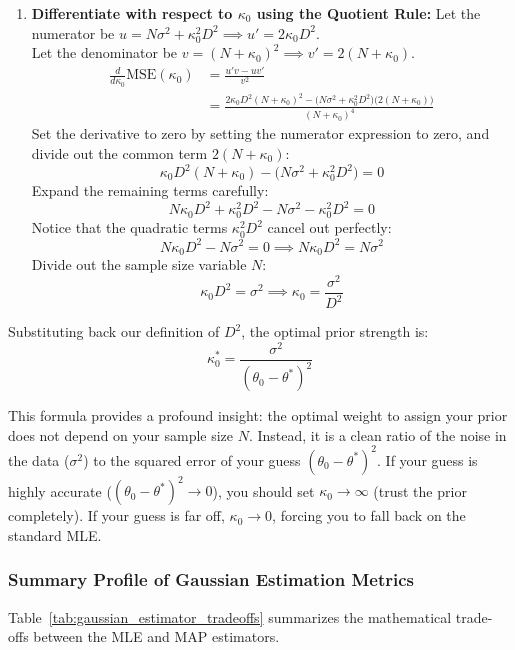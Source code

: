 \documentclass{article}
\begin{document}
\begin{enumerate}
    \item \textbf{Differentiate with respect to $\kappa_0$ using the Quotient Rule:}
    Let the numerator be $u = N\sigma^2 + \kappa_0^2 D^2 \implies u' = 2\kappa_0 D^2$. \\
    Let the denominator be $v = (N + \kappa_0)^2 \implies v' = 2(N + \kappa_0)$.
    \begin{align}
    \frac{d}{d\kappa_0}\text{MSE}(\kappa_0) &= \frac{u'v - uv'}{v^2} \\
    &= \frac{2\kappa_0 D^2(N + \kappa_0)^2 - \big(N\sigma^2 + \kappa_0^2 D^2\big)\big(2(N + \kappa_0)\big)}{(N + \kappa_0)^4}
    \end{align}
    Set the derivative to zero by setting the numerator expression to zero, and divide out the common term $2(N + \kappa_0)$:
    \begin{equation}
    \kappa_0 D^2(N + \kappa_0) - \big(N\sigma^2 + \kappa_0^2 D^2\big) = 0
    \end{equation}
    Expand the remaining terms carefully:
    \begin{equation}
    N\kappa_0 D^2 + \kappa_0^2 D^2 - N\sigma^2 - \kappa_0^2 D^2 = 0
    \end{equation}
    Notice that the quadratic terms $\kappa_0^2 D^2$ cancel out perfectly:
    \begin{equation}
    N\kappa_0 D^2 - N\sigma^2 = 0 \implies N\kappa_0 D^2 = N\sigma^2
    \end{equation}
    Divide out the sample size variable $N$:
    \begin{equation}
    \kappa_0 D^2 = \sigma^2 \implies \kappa_0 = \frac{\sigma^2}{D^2}
    \end{equation}
\end{enumerate}
Substituting back our definition of $D^2$, the optimal prior strength is:
\begin{equation}
\kappa_0^* = \frac{\sigma^2}{(\theta_0 - \theta^*)^2}
\end{equation}

This formula provides a profound insight: the optimal weight to assign your prior does not depend on your sample size $N$. Instead, it is a clean ratio of the noise in the data ($\sigma^2$) to the squared error of your guess $(\theta_0 - \theta^*)^2$. If your guess is highly accurate ($(\theta_0 - \theta^*)^2 \to 0$), you should set $\kappa_0 \to \infty$ (trust the prior completely). If your guess is far off, $\kappa_0 \to 0$, forcing you to fall back on the standard MLE.

\subsubsection{Summary Profile of Gaussian Estimation Metrics}
Table~\ref{tab:gaussian_estimator_tradeoffs} summarizes the mathematical trade-offs between the MLE and MAP estimators.
\end{document}
